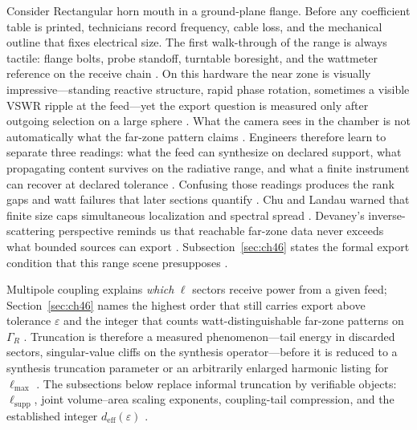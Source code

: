 \begin{physicalvignette}
Consider Rectangular horn mouth in a ground-plane flange. Before any coefficient table is printed, technicians record frequency, cable loss, and the mechanical outline that fixes electrical size. The first walk-through of the range is always tactile: flange bolts, probe standoff, turntable boresight, and the wattmeter reference on the receive chain \cite{hansen1988}.
On this hardware the near zone is visually impressive---standing reactive structure, rapid phase rotation, sometimes a visible VSWR ripple at the feed---yet the export question is measured only after outgoing selection on a large sphere \cite{harrington2001}. What the camera sees in the chamber is not automatically what the far-zone pattern claims \cite{stratton1941}.
Engineers therefore learn to separate three readings: what the feed can synthesize on declared support, what propagating content survives on the radiative range, and what a finite instrument can recover at declared tolerance \cite{devaney2004}. Confusing those readings produces the rank gaps and watt failures that later sections quantify \cite{pal2026}.
Chu and Landau warned that finite size caps simultaneous localization and spectral spread \cite{chu1948}. Devaney's inverse-scattering perspective reminds us that reachable far-zone data never exceeds what bounded sources can export \cite{devaney2004}.
Subsection~\ref{sec:ch46} states the formal export condition that this range scene presupposes \cite{stratton1941}.
\end{physicalvignette}
Multipole coupling explains \emph{which} $\ell$ sectors receive power from a given feed; Section~\ref{sec:ch46} names the highest order that still carries export above tolerance $\varepsilon$ and the integer that counts watt-distinguishable far-zone patterns on $\Gamma_R$ \cite{hansen1988}. Truncation is therefore a measured phenomenon---tail energy in discarded sectors, singular-value cliffs on the synthesis operator---before it is reduced to a synthesis truncation parameter or an arbitrarily enlarged harmonic listing for $\ell_{\max}$ \cite{harrington2001}. The subsections below replace informal truncation by verifiable objects: $\ell_{\mathrm{supp}}$, joint volume--area scaling exponents, coupling-tail compression, and the established integer $d_{\mathrm{eff}}(\varepsilon)$ \cite{jackson1999}.
